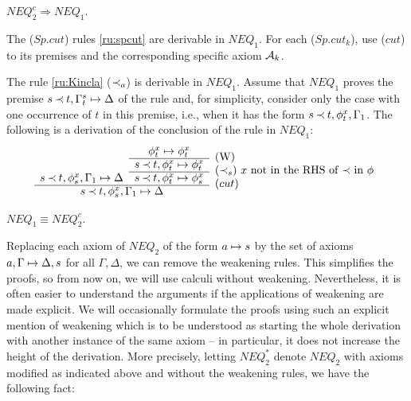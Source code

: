 \begin{LEMMA} $NEQ_2^c \Rightarrow NEQ_1$.\end{LEMMA}
\begin{PROOF}
\begin{LS}
\item The ($Sp.cut$) rules \ref{ru:spcut} are derivable in $NEQ_1$.
For each ($Sp.cut_k$), use ($cut$) to its premises and the 
corresponding specific axiom ${\cal {A}}_k$.
\item  The rule \ref{ru:Kincla} ($\mathbin{\prec}_a$) is derivable in $NEQ_1$.
Assume that $NEQ_1$ proves the premise 
$s\mathbin{\prec} t,\Gamma_t^s\mathrel{\mapsto}\Delta$ of the rule and, for simplicity, 
consider only the case with one occurrence of $t$ in this premise, i.e., when
it has the form $s\mathbin{\prec} t, \phi_t^x,\Gamma_1$. The following is a derivation of
the conclusion of the rule in $NEQ_1$:
\[ \begin{array}{ccl}
 & \phi_t^x\Seq \phi_t^x & \raisebox{-1.2ex}[1.5ex][0ex]{(W)} \\ \cline{2-2}
 & s\Incl t,\phi_t^x\Seq \phi_t^x & \raisebox{-1.2ex}[1.5ex][0ex]{($\Incl_s$) $x$
 not in the RHS of $\Incl$ in $\phi$} 
      \\ \cline{2-2}
s\Incl t, \phi_s^x, \Gamma_1\Seq\Delta & s\Incl t, \phi_t^x \Seq \phi_s^x 
   & \raisebox{-1.2ex}[1.5ex][0ex]{($cut$)} \\ \cline{1-2}
\multicolumn{2}{c}{s\Incl t,\phi_s^x,\Gamma_1\Seq\Delta}
\end{array} \]
\end{LS}
\end{PROOF}

\begin{LEMMA}\label{le:neq1isneq2} $NEQ_1 \equiv NEQ_2^c$.\end{LEMMA}
\noindent
Replacing each axiom of $NEQ_2$ of the form $a\mathrel{\mapsto} s$ by
the set of axioms $a, \Gamma\mathrel{\mapsto}\Delta, s$ for all $\Gamma, \Delta$, we can
remove the weakening rules. This simplifies the proofs, so from now on, we will use 
calculi without weakening. Nevertheless, it is often easier to understand the arguments if
the applications of weakening are made explicit. We will occasionally
formulate the proofs using such an explicit mention of weakening which is to
be understood as starting the whole derivation with another instance of the
same axiom -- in particular, it does not increase the height of the
derivation. More precisely, letting $NEQ_2^*$ denote $NEQ_2$ with axioms 
modified as indicated above and without the weakening rules, we have the following fact:

